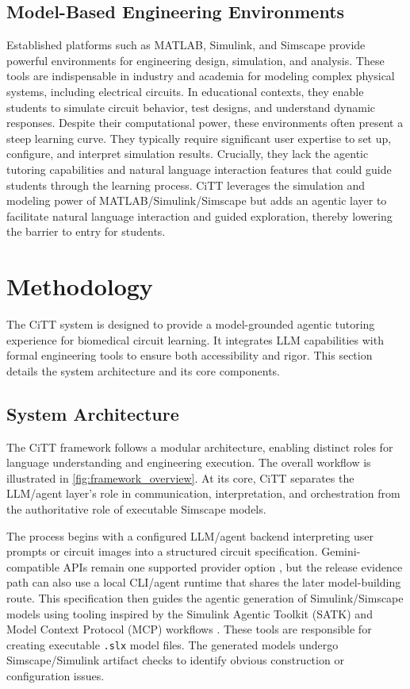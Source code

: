 \documentclass[10pt,twocolumn,letterpaper]{article}
\begin{document}
\subsection{Model-Based Engineering Environments}
Established platforms such as MATLAB, Simulink, and Simscape \cite{mathworks_matlab, mathworks_simulink, mathworks_simscape} provide powerful environments for engineering design, simulation, and analysis. These tools are indispensable in industry and academia for modeling complex physical systems, including electrical circuits. In educational contexts, they enable students to simulate circuit behavior, test designs, and understand dynamic responses. Despite their computational power, these environments often present a steep learning curve. They typically require significant user expertise to set up, configure, and interpret simulation results. Crucially, they lack the agentic tutoring capabilities and natural language interaction features that could guide students through the learning process. CiTT leverages the simulation and modeling power of MATLAB/Simulink/Simscape but adds an agentic layer to facilitate natural language interaction and guided exploration, thereby lowering the barrier to entry for students.

\section{Methodology}
\label{sec:method}
The CiTT system is designed to provide a model-grounded agentic tutoring experience for biomedical circuit learning. It integrates LLM capabilities with formal engineering tools to ensure both accessibility and rigor. This section details the system architecture and its core components.

\subsection{System Architecture}
\label{sec:method_architecture}
The CiTT framework follows a modular architecture, enabling distinct roles for language understanding and engineering execution. The overall workflow is illustrated in \cref{fig:framework_overview}. At its core, CiTT separates the LLM/agent layer's role in communication, interpretation, and orchestration from the authoritative role of executable Simscape models.

The process begins with a configured LLM/agent backend interpreting user prompts or circuit images into a structured circuit specification. Gemini-compatible APIs remain one supported provider option \cite{gemini_api_docs}, but the release evidence path can also use a local CLI/agent runtime that shares the later model-building route. This specification then guides the agentic generation of Simulink/Simscape models using tooling inspired by the Simulink Agentic Toolkit (SATK) and Model Context Protocol (MCP) workflows \cite{mathworks_satk, matlab_agentic_toolkit}. These tools are responsible for creating executable \texttt{.slx} model files. The generated models undergo Simscape/Simulink artifact checks to identify obvious construction or configuration issues.
\end{document}
